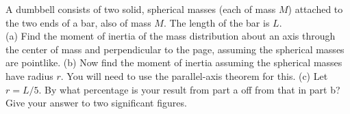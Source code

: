 A dumbbell consists of two solid, spherical masses (each of mass $M$)
attached to the two ends of a bar, also of mass $M$. The length of
the bar is $L$.\\
%
(a) Find the moment of inertia of the mass distribution about an axis
through the center of mass and perpendicular to the page, assuming the spherical
masses are pointlike.\answercheck\hwendpart
%
(b) Now find the moment of inertia assuming the spherical
masses have radius $r$. You will need to use the parallel-axis
theorem for this.\answercheck\hwendpart
%
(c) Let $r=L/5$. By what percentage is your result from part a off from that in
part b? Give your answer to two significant
figures.\answercheck
